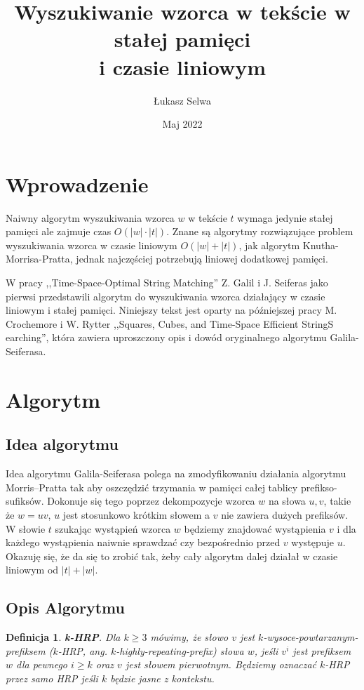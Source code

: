 \documentclass{article}
\title{Wyszukiwanie wzorca w tekście w stałej pamięci\\ i czasie liniowym}
\author{Łukasz Selwa}
\date{Maj 2022}
\newtheorem{definition}{Definicja}[section]
\begin{document}
\maketitle

\section{Wprowadzenie}
Naiwny algorytm wyszukiwania wzorca $w$ w tekście $t$ wymaga jedynie stałej pamięci ale zajmuje czas $O(|w| \cdot |t|)$. 
Znane są algorytmy rozwiązujące problem wyszukiwania wzorca w czasie liniowym $O(|w| + |t|)$, jak algorytm Knutha-Morrisa-Pratta, jednak najczęściej potrzebują liniowej dodatkowej pamięci.


W pracy ,,Time-Space-Optimal String Matching'' Z. Galil i J. Seiferas jako pierwsi przedstawili algorytm do wyszukiwania wzorca działający w czasie liniowym i stałej pamięci.
Niniejszy tekst jest oparty na późniejszej pracy M. Crochemore i W. Rytter ,,Squares, Cubes, and Time-Space Efficient StringS earching'', która zawiera uproszczony opis i dowód oryginalnego algorytmu Galila-Seiferasa.

\section{Algorytm}

\subsection{Idea algorytmu}
Idea algorytmu Galila-Seiferasa polega na zmodyfikowaniu działania algorytmu Morris–Pratta tak aby oszczędzić trzymania w pamięci całej tablicy prefikso-sufiksów.
Dokonuje się tego poprzez dekompozycje wzorca $w$ na słowa $u,v$, takie że $w = u v$, $u$ jest stosunkowo krótkim słowem a $v$ nie zawiera dużych prefiksów.
W słowie $t$ szukając wystąpień wzorca $w$ będziemy znajdować wystąpienia $v$ i dla każdego wystąpienia naiwnie sprawdzać czy bezpośrednio przed $v$ występuje $u$.
Okazuję się, że da się to zrobić tak, żeby cały algorytm dalej działał w czasie liniowym od $|t| + |w|$.

\subsection{Opis Algorytmu}

\begin{definition}
\textbf{\textit{k-HRP}}.
Dla $k \geq 3$ mówimy, że słowo $v$ jest $k$-wysoce-powtarzanym-prefiksem ($k$-HRP, ang. $k$-\textit{highly-repeating-prefix}) słowa $w$, jeśli $v^i$ jest prefiksem $w$ dla pewnego $i \geq k$ oraz $v$ jest słowem pierwotnym.
Będziemy oznaczać $k$-HRP przez samo HRP jeśli $k$ będzie jasne z kontekstu.
\end{definition}
\end{document}
